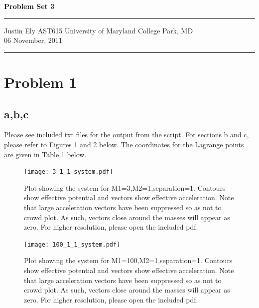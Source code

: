 \documentclass[a4paper,11pt]{article}
\begin{document}
\begin{flushright}

\vspace{1.1cm}

{\bf\Huge Problem Set 3}

\rule{0.25\linewidth}{0.5pt}

\vspace{0.5cm}
Justin Ely
\linebreak
\newline
\footnotesize{AST615 University of Maryland College Park, MD\\}
\vspace{0.5cm}
06 November, 2011
\end{flushright}

\noindent\rule{\linewidth}{1.0pt}
\section*{Problem 1}
\subsection*{a,b,c}
Please see included txt files for the output from the script.  For sections b and c, please refer to Figures 1 and 2 below.  The coordinates for the Lagrange points are given in Table 1 below.


\begin{figure}[h!]
\begin{center}
\texttt{[image: 3\_1\_1\_system.pdf]}
\caption{Plot showing the system for M1=3,M2=1,separation=1.  Contours show effective potential and vectors show effective acceleration.  Note that large acceleration vectors have been suppressed so as not to crowd plot.  As such, vectors close around the masses will appear as zero.  For higher resolution, please open the included pdf.}
\end{center}
\end{figure}

\begin{figure}[h!]
\begin{center}
\texttt{[image: 100\_1\_1\_system.pdf]}
\caption{Plot showing the system for M1=100,M2=1,separation=1.  Contours show effective potential and vectors show effective acceleration.  Note that large acceleration vectors have been suppressed so as not to crowd plot.  As such, vectors close around the masses will appear as zero.  For higher resolution, please open the included pdf.}
\end{center}
\end{figure}
\end{document}
